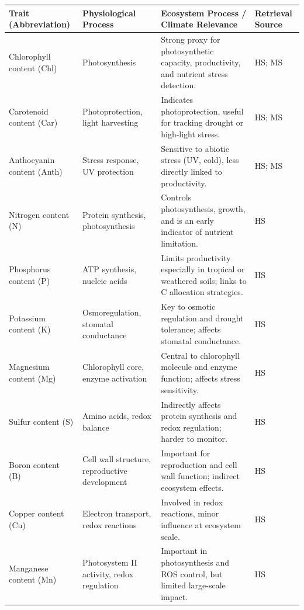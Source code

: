 \documentclass[pdflatex,sn-mathphys-num]{sn-jnl}%
\theoremstyle{thmstyleone}%
\theoremstyle{thmstyletwo}%
\theoremstyle{thmstylethree}%
\begin{document}
\renewcommand{\tabularxcolumn}[1]{>{\raggedright\arraybackslash}p{#1}}
\small
\begin{table}[htbp]
\begin{tabularx}{\textwidth}{
  p{}  %
  p{}  %
  p{}  %
  p{}  %
}
\toprule
\textbf{Trait (Abbreviation)} & \textbf{Physiological Process} & \textbf{Ecosystem Process / Climate Relevance} & \textbf{Retrieval Source} \\
\midrule
Chlorophyll content (Chl) & Photosynthesis & Strong proxy for photosynthetic capacity, productivity, and nutrient stress detection. & HS; MS\\
\midrule
Carotenoid content (Car) & Photoprotection, light harvesting & Indicates photoprotection, useful for tracking drought or high-light stress. & HS; MS\\
\midrule
Anthocyanin content (Anth) & Stress response, UV protection & Sensitive to abiotic stress (UV, cold), less directly linked to productivity. & HS; MS \\
\midrule
Nitrogen content (N) & Protein synthesis, photosynthesis & Controls photosynthesis, growth, and is an early indicator of nutrient limitation. & HS\\
\midrule
Phosphorus content (P) & ATP synthesis, nucleic acids & Limits productivity especially in tropical or weathered soils; links to C allocation strategies. & HS\\
\midrule
Potassium content (K) & Osmoregulation, stomatal conductance & Key to osmotic regulation and drought tolerance; affects stomatal conductance. & HS\\
\midrule
Magnesium content (Mg) & Chlorophyll core, enzyme activation & Central to chlorophyll molecule and enzyme function; affects stress sensitivity. & HS\\
\midrule
Sulfur content (S) & Amino acids, redox balance & Indirectly affects protein synthesis and redox regulation; harder to monitor. & HS\\
\midrule
Boron content (B) & Cell wall structure, reproductive development & Important for reproduction and cell wall function; indirect ecosystem effects. & HS\\
\midrule
Copper content (Cu) & Electron transport, redox reactions & Involved in redox reactions, minor influence at ecosystem scale. & HS\\
\midrule
Manganese content (Mn) & Photosystem II activity, redox regulation & Important in photosynthesis and ROS control, but limited large-scale impact. & HS\\

\end{tabularx}
\end{table}
\end{document}
